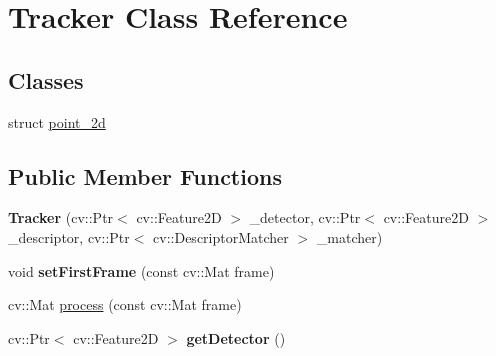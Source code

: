 \hypertarget{classTracker}{}\section{Tracker Class Reference}
\label{classTracker}
\subsection*{Classes}
\begin{DoxyCompactItemize}
\item 
struct \hyperlink{structTracker_1_1point__2d}{point\+\_\+2d}
\end{DoxyCompactItemize}
\subsection*{Public Member Functions}
\begin{DoxyCompactItemize}
\item 
{\bfseries Tracker} (cv\+::\+Ptr$<$ cv\+::\+Feature2D $>$ \+\_\+detector, cv\+::\+Ptr$<$ cv\+::\+Feature2D $>$ \+\_\+descriptor, cv\+::\+Ptr$<$ cv\+::\+Descriptor\+Matcher $>$ \+\_\+matcher)\hypertarget{classTracker_af96a2d9f4a4a75ed80debb4168a67771}{}\label{classTracker_af96a2d9f4a4a75ed80debb4168a67771}

\item 
void {\bfseries set\+First\+Frame} (const cv\+::\+Mat frame)\hypertarget{classTracker_a21363f13f0bac8489352f9f19b63c86c}{}\label{classTracker_a21363f13f0bac8489352f9f19b63c86c}

\item 
cv\+::\+Mat \hyperlink{classTracker_a0766c4a3b0dd3a4d18542909b06f0b33}{process} (const cv\+::\+Mat frame)
\item 
cv\+::\+Ptr$<$ cv\+::\+Feature2D $>$ {\bfseries get\+Detector} ()\hypertarget{classTracker_a55015ab9a5d61d09ab10a06b5b6181ec}{}\label{classTracker_a55015ab9a5d61d09ab10a06b5b6181ec}

\end{DoxyCompactItemize}
